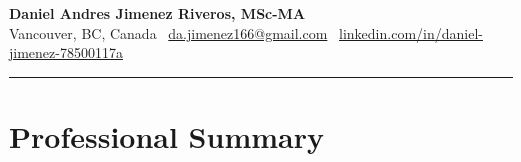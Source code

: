 \documentclass[10pt,a4paper]{article}
\begin{document}
\titlespacing*{\section}{0pt}{0pt}{10pt} 
\titlespacing*{\subsection}{0pt}{10pt}{5pt} 
\titlespacing*{\section}{0pt}{0pt}{4pt}


\pagestyle{empty}

{
\centering
{\Huge\textbf{Daniel Andres Jimenez Riveros, MSc-MA}}\\
\medskip 
Vancouver, BC, Canada \textbar\ \href{mailto:da.jimenez166@gmail.com}{da.jimenez166@gmail.com} \textbar\ \href{https://www.linkedin.com/in/daniel-jimenez-78500117a/}{linkedin.com/in/daniel-jimenez-78500117a}\\
}




\rule{\textwidth}{0.4pt} 

\section*{Professional Summary}
\end{document}
